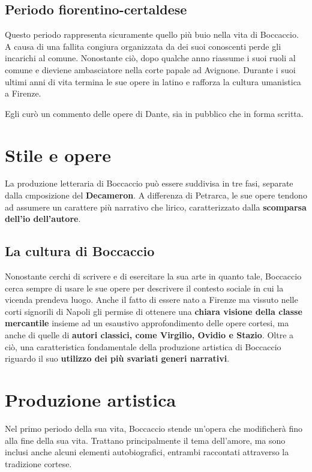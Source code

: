\documentclass[10pt,a4paper]{article}
\begin{document}
	 \subsection{Periodo fiorentino-certaldese}

	 Questo periodo rappresenta sicuramente quello più buio nella vita di Boccaccio. A causa di una fallita congiura organizzata da dei suoi conoscenti perde gli incarichi al comune. Nonostante ciò, dopo qualche anno riassume i suoi ruoli al comune e dieviene ambasciatore nella corte papale ad Avignone. Durante i suoi ultimi anni di vita termina le sue opere in latino e rafforza la cultura umanistica a Firenze.

	 Egli curò un commento delle opere di Dante, sia in pubblico che in forma scritta.

	 \section{Stile e opere}

	 La produzione letteraria di Boccaccio può essere suddivisa in tre fasi, separate dalla cmposizione del \textbf{Decameron}. A differenza di Petrarca, le sue opere tendono ad assumere un carattere più narrativo che lirico, caratterizzato dalla \textbf{scomparsa dell'io dell'autore}.

	 \subsection{La cultura di Boccaccio}

	 Nonostante cerchi di scrivere e di esercitare la sua arte in quanto tale, Boccaccio cerca sempre di usare le sue opere per descrivere il contesto sociale in cui la vicenda prendeva luogo. Anche il fatto di essere nato a Firenze ma vissuto nelle corti signorili di Napoli gli permise di ottenere una \textbf{chiara visione della classe mercantile} insieme ad un esaustivo approfondimento delle opere cortesi, ma anche di quelle di \textbf{autori classici, come Virgilio, Ovidio e Stazio}. Oltre a ciò, una caratteristica fondamentale della produzione artistica di Boccaccio riguardo il suo \textbf{utilizzo dei più svariati generi narrativi}.

	 \section{Produzione artistica}

	 Nel primo periodo della sua vita, Boccaccio stende un'opera che modificherà fino alla fine della sua vita. Trattano principalmente il tema dell'amore, ma sono inclusi anche alcuni elementi autobiografici, entrambi raccontati attraverso la tradizione cortese.
\end{document}
